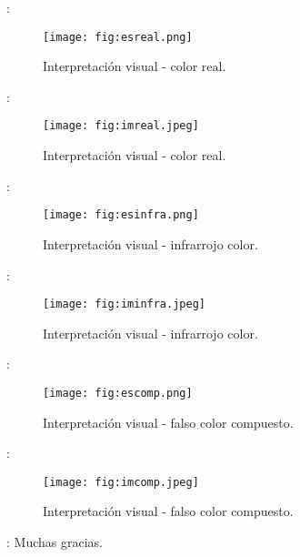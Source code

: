 \begin{frame}{\secname : \subsecname}
  \begin{figure}
    \centering
    \texttt{[image: fig:esreal.png]}
    \caption{Interpretación visual - color real. }
    \label{}
  \end{figure}
\end{frame}

\begin{frame}{\secname : \subsecname}
  \begin{figure}
    \centering
    \texttt{[image: fig:imreal.jpeg]}
    \caption{Interpretación visual - color real.}
    \label{}
  \end{figure}
\end{frame}

\begin{frame}{\secname : \subsecname}
  \begin{figure}
    \centering
    \texttt{[image: fig:esinfra.png]}
    \caption{Interpretación visual - infrarrojo color.}
    \label{}
  \end{figure}
\end{frame}

\begin{frame}{\secname : \subsecname}
  \begin{figure}
    \centering
    \texttt{[image: fig:iminfra.jpeg]}
    \caption{Interpretación visual - infrarrojo color.}
    \label{}
  \end{figure}
\end{frame}

\begin{frame}{\secname : \subsecname}
  \begin{figure}
    \centering
    \texttt{[image: fig:escomp.png]}
    \caption{Interpretación visual - falso color compuesto.}
    \label{}
  \end{figure}
\end{frame}

\begin{frame}{\secname : \subsecname}
  \begin{figure}
    \centering
    \texttt{[image: fig:imcomp.jpeg]}
    \caption{Interpretación visual - falso color compuesto.}
    \label{}
  \end{figure}
\end{frame}

\begin{frame}{\secname : \subsecname}
Muchas gracias.
\end{frame}
